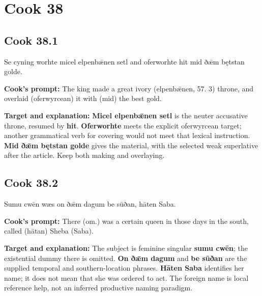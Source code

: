 \clearpage
\section*{Cook 38}

\par\begin{minipage}{\linewidth}\raggedright
\subsection*{Cook 38.1}

Se cyning worhte micel elpenbǣnen setl and oferworhte hit mid ðǣm bętstan golde.

\textbf{Cook's prompt:} The king made a great ivory (elpenbǣnen, 57. 3) throne, and overlaid (oferwyrcean) it with (mid) the best gold.

\textbf{Target and explanation:} \textbf{Micel elpenbǣnen setl} is the neuter accusative throne, resumed by \textbf{hit}. \textbf{Oferworhte} meets the explicit oferwyrcean target; another grammatical verb for covering would not meet that lexical instruction. \textbf{Mid ðǣm bętstan golde} gives the material, with the selected weak superlative after the article. Keep both making and overlaying.

\end{minipage}\par\addvspace{4pt}

\par\begin{minipage}{\linewidth}\raggedright
\subsection*{Cook 38.2}

Sumu cwēn wæs on ðǣm dagum be sūðan, hāten Saba.

\textbf{Cook's prompt:} There (om.) was a certain queen in those days in the south, called (hātan) Sheba (Saba).

\textbf{Target and explanation:} The subject is feminine singular \textbf{sumu cwēn}; the existential dummy there is omitted. \textbf{On ðǣm dagum} and \textbf{be sūðan} are the supplied temporal and southern-location phrases. \textbf{Hāten Saba} identifies her name; it does not mean that she was ordered to act. The foreign name is local reference help, not an inferred productive naming paradigm.

\end{minipage}\par\addvspace{4pt}

